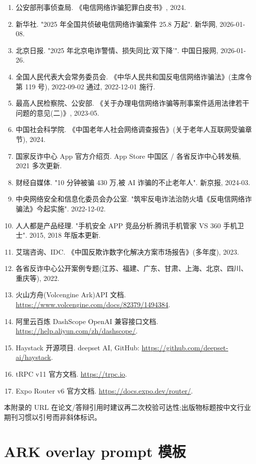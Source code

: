 \documentclass[UTF8,a4paper,12pt]{ctexart}
\begin{document}
\begin{enumerate}[leftmargin=2.2em,itemsep=0.25em]
    \item 公安部刑事侦查局. 《电信网络诈骗犯罪白皮书》, 2024.
    \item 新华社. "2025 年全国共侦破电信网络诈骗案件 25.8 万起". 新华网, 2026-01-08.
    \item 北京日报. "2025 年北京电诈警情、损失同比'双下降'". 中国日报网, 2026-01-26.
    \item 全国人民代表大会常务委员会. 《中华人民共和国反电信网络诈骗法》(主席令第 119 号), 2022-09-02 通过, 2022-12-01 施行.
    \item 最高人民检察院、公安部. 《关于办理电信网络诈骗等刑事案件适用法律若干问题的意见(二)》, 2023-05.
    \item 中国社会科学院. 《中国老年人社会网络调查报告》(关于老年人互联网受骗章节), 2024.
    \item 国家反诈中心 App 官方介绍页. App Store 中国区 / 各省反诈中心转发稿, 2021 多次更新.
    \item 财经自媒体. "10 分钟被骗 430 万,被 AI 诈骗的不止老年人". 新京报, 2024-03.
    \item 中央网络安全和信息化委员会办公室. "筑牢反电诈法治防火墙《反电信网络诈骗法》今起实施". 2022-12-02.
    \item 人人都是产品经理. "手机安全 APP 竞品分析:腾讯手机管家 VS 360 手机卫士". 2015, 2018 年版本更新.
    \item 艾瑞咨询、IDC. 《中国反欺诈数字化解决方案市场报告》(多年度), 2023.
    \item 各省反诈中心公开案例专题(江苏、福建、广东、甘肃、上海、北京、四川、重庆等), 2022.
    \item 火山方舟(Volcengine Ark)API 文档. \url{https://www.volcengine.com/docs/82379/1494384}.
    \item 阿里云百炼 DashScope OpenAI 兼容接口文档. \url{https://help.aliyun.com/zh/dashscope/}.
    \item Haystack 开源项目. deepset AI, GitHub: \url{https://github.com/deepset-ai/haystack}.
    \item tRPC v11 官方文档. \url{https://trpc.io}.
    \item Expo Router v6 官方文档. \url{https://docs.expo.dev/router/}.
\end{enumerate}

本附录的 URL 在论文/答辩引用时建议再二次校验可达性;出版物标题按中文行业期刊习惯以引号而非斜体标识。

\section{ARK overlay prompt 模板}
\end{document}
